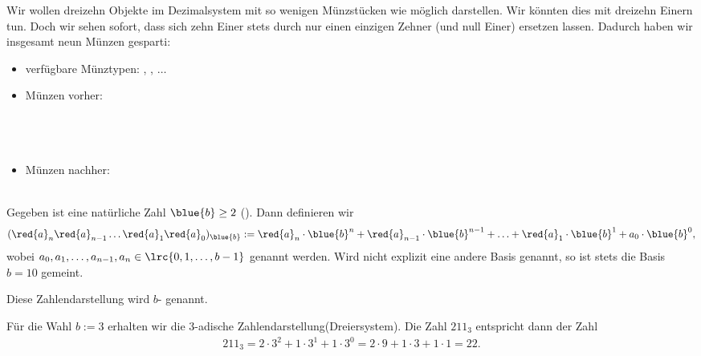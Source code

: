 \begin{myexample}
  Wir wollen dreizehn Objekte im Dezimalsystem mit so wenigen Münzstücken wie möglich darstellen. Wir könnten dies mit
  dreizehn Einern tun. Doch wir sehen sofort, dass sich zehn Einer stets durch nur einen einzigen Zehner (und null
  Einer) ersetzen lassen. Dadurch haben wir insgesamt neun Münzen gesparti:
  \begin{itemize}
  \item verfügbare Münztypen: , , $\ldots$
    \item Münzen vorher:\\
    \\
    \\
    \\
    \item Münzen nachher:\\
    \\
\end{itemize}
\end{myexample}

\begin{mydefinition}
  Gegeben ist eine natürliche Zahl $\blue{b}\geq 2$ (). Dann definieren wir
   \begin{align*}
     (\red{a}_{n}\red{a}_{n-1}\ldots \red{a}_{1}\red{a}_{0})_{\blue{b}} := \red{a}_n\cdot \blue{b}^n + \red{a}_{n-1}\cdot \blue{b}^{n-1} + \ldots +\red{a}_1\cdot \blue{b}^1 + a_0\cdot
     \blue{b}^0,
   \end{align*}
 wobei $a_{0}, a_{1},\ldots, a_{n-1}, a_{n}\in\lrc{0,1,\ldots,b-1}$  genannt werden. Wird
 nicht explizit eine andere Basis genannt, so ist stets die Basis $b=10$ gemeint.

 Diese Zahlendarstellung wird $b$- genannt.
\end{mydefinition}

\begin{myexample}
  Für die Wahl $b:=3$ erhalten wir die $3$-adische Zahlendarstellung(Dreiersystem). Die Zahl $211_3$ entspricht dann der Zahl
  \begin{align*}
    211_3 = 2\cdot 3^2 + 1\cdot 3^1 + 1\cdot 3^0 = 2\cdot 9 + 1\cdot 3 + 1\cdot 1 = 22.
  \end{align*}
\end{myexample}

